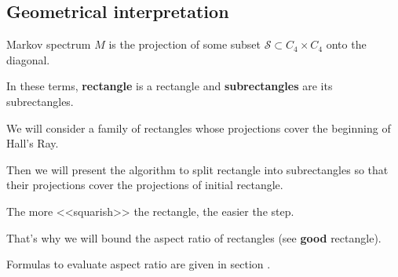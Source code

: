 \subsection{Geometrical interpretation}

Markov spectrum $M$ is the projection of some subset $\mathcal{S} \subset C_4 \times C_4$ onto the diagonal.

In these terms, \textbf{rectangle} is a rectangle and \textbf{subrectangles} are its subrectangles.

We will consider a family of rectangles whose projections cover the beginning of Hall's Ray.

Then we will present the algorithm to split rectangle into subrectangles so that their projections cover the projections of initial rectangle.

The more <<squarish>> the rectangle, the easier the step.

That's why we will bound the aspect ratio of rectangles (see \textbf{good} rectangle).

Formulas to evaluate aspect ratio are given in section .
